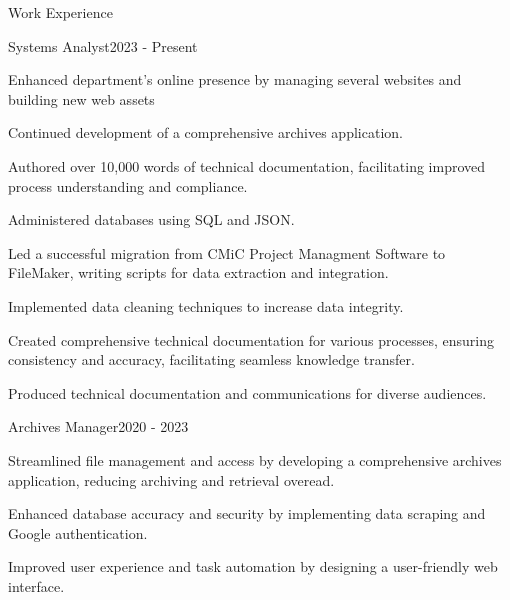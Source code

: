 \documentclass{resume} %
\begin{document}
    \begin{rSection}{Work Experience}
                    \begin{rSubsection}
                {Systems Analyst}{2023 - Present}
                                    {}
                                {}
                                    \item Enhanced department's online presence by managing several websites and building new web assets
                                    \item Continued development of a comprehensive archives application.
                                    \item Authored over 10,000 words of technical documentation, facilitating improved process understanding and compliance.
                                    \item Administered databases using SQL and JSON.
                                    \item Led a successful migration from CMiC Project Managment Software to FileMaker, writing scripts for data extraction and integration.
                                    \item Implemented data cleaning techniques to increase data integrity.
                                    \item Created comprehensive technical documentation for various processes, ensuring consistency and accuracy, facilitating seamless knowledge transfer.
                                    \item Produced technical documentation and communications for diverse audiences.
                            \end{rSubsection}
                    \begin{rSubsection}
                {Archives Manager}{2020 - 2023}
                                    {}
                                {}
                                    \item Streamlined file management and access by developing a comprehensive archives application, reducing archiving and retrieval overead.
                                    \item Enhanced database accuracy and security by implementing data scraping and Google authentication.
                                    \item Improved user experience and task automation by designing a user{-}friendly web interface.

\end{rSubsection}
\end{rSection}
\end{document}
